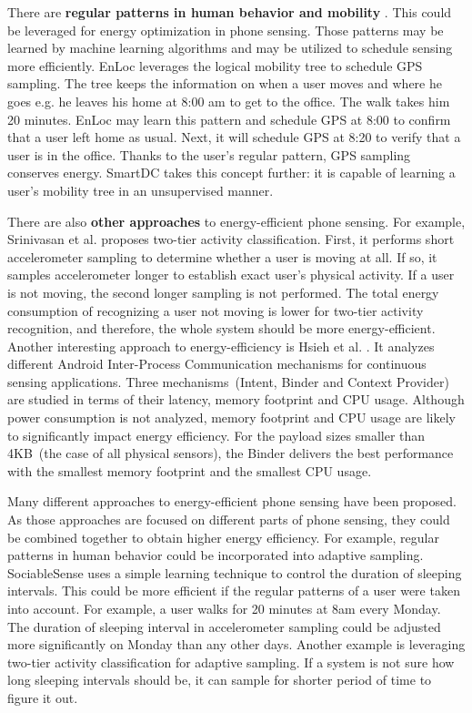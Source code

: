 There are \textbf{regular patterns in human behavior and mobility} \cite{falaki:diversity} \cite{banerjee:batteries}. This could be leveraged for energy optimization in phone sensing. Those patterns may be learned by machine learning algorithms and may be utilized to schedule sensing more efficiently. EnLoc \cite{constandache:enloc} leverages the logical mobility tree to schedule GPS sampling. The tree keeps the information on when a user moves and where he goes e.g. he leaves his home at 8:00 am to get to the office. The walk takes him 20 minutes. EnLoc may learn this pattern and schedule GPS at 8:00 to confirm that a user left home as usual. Next, it will schedule GPS at 8:20 to verify that a user is in the office. Thanks to the user's regular pattern, GPS sampling conserves energy.  SmartDC \cite{chon:smartdc} takes this concept further: it is capable of learning a user's mobility tree in an unsupervised manner.

There are also \textbf{other approaches} to energy-efficient phone sensing. For example, Srinivasan et al. \cite{srinivasan:twotier} proposes two-tier activity classification. First, it performs short accelerometer sampling to determine whether a user is moving at all. If so, it samples accelerometer longer to establish exact user's physical activity. If a user is not moving, the second longer sampling is not performed. The total energy consumption of recognizing a user not moving is lower for two-tier activity recognition, and therefore, the whole system should be more energy-efficient. Another interesting approach to energy-efficiency is Hsieh et al. \cite{hsieh:ipc}. It analyzes different Android Inter-Process Communication mechanisms for continuous sensing applications. Three mechanisms\ (Intent, Binder and Context Provider) are studied in terms of their latency, memory footprint and CPU usage. Although power consumption is not analyzed, memory footprint and CPU usage are likely to significantly impact energy efficiency. For the payload sizes smaller than 4KB\ (the case of all physical sensors), the Binder delivers the best performance with the smallest memory footprint and the smallest CPU usage.

Many different approaches to energy-efficient phone sensing have been proposed. As those approaches are focused on different parts of phone sensing, they could be combined together to obtain higher energy efficiency. For example, regular patterns in human behavior could be incorporated into adaptive sampling. SociableSense \cite{rachuri:socialsense} uses a simple learning technique to control the duration of sleeping intervals. This could be more efficient if the regular patterns of a user were taken into account. For example, a user walks for 20 minutes at 8am every Monday. The duration of sleeping interval in accelerometer sampling could be adjusted more significantly on Monday than any other days. Another example is leveraging two-tier activity classification for adaptive sampling. If a system is not sure how long sleeping intervals should be, it can sample for shorter period of time to figure it out. 

